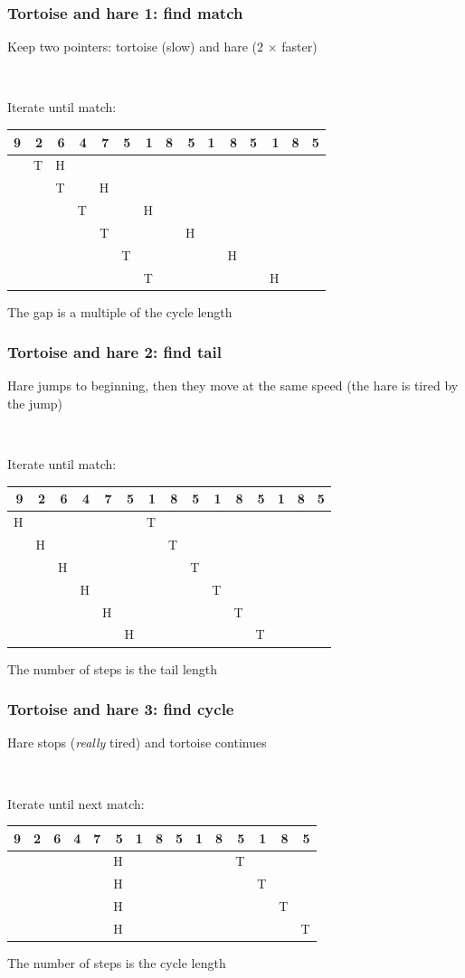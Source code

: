 \documentclass[12pt]{beamer}
\begin{document}
\begin{frame}
\frametitle{Tortoise and hare 1: find match}
Keep two pointers: tortoise (slow) and hare ($2\,\times$\,faster)

~

Iterate until match:
\begin{center}
\begin{tabu}{rrrrrrrrrrrrrrr}
9&2&6&4&7&5&\textbf{1}&8&5&1&8&5&\textbf{1}&8&5\\
\midrule
&T&H\\
&&T&&H\\
&&&T&&&H\\
&&&&T&&&&H\\
&&&&&T&&&&&H\\
&&&&&&T&&&&&&H\\
\end{tabu}
\end{center}
The gap is a multiple of the cycle length
\end{frame}

\begin{frame}
\frametitle{Tortoise and hare 2: find tail}
Hare jumps to beginning, then they move at the same speed (the hare is tired by the jump)

~

Iterate until match:
\begin{center}
\begin{tabu}{rrrrrrrrrrrrrrr}
9&2&6&4&7&\textbf{5}&1&8&5&1&8&\textbf{5}&1&8&5\\
\midrule
H&&&&&&T\\
&H&&&&&&T\\
&&H&&&&&&T\\
&&&H&&&&&&T\\
&&&&H&&&&&&T\\
&&&&&H&&&&&&T\\
\end{tabu}
\end{center}
The number of steps is the tail length
\end{frame}

\begin{frame}
\frametitle{Tortoise and hare 3: find cycle}
Hare stops (\emph{really} tired) and tortoise continues

~

Iterate until next match:
\begin{center}
\begin{tabu}{rrrrrrrrrrrrrrr}
9&2&6&4&7&\textbf{5}&1&8&5&1&8&5&1&8&\textbf{5}\\
\midrule
&&&&&H&&&&&&T\\
&&&&&H&&&&&&&T\\
&&&&&H&&&&&&&&T\\
&&&&&H&&&&&&&&&T\\
\end{tabu}
\end{center}
The number of steps is the cycle length
\end{frame}
\end{document}
